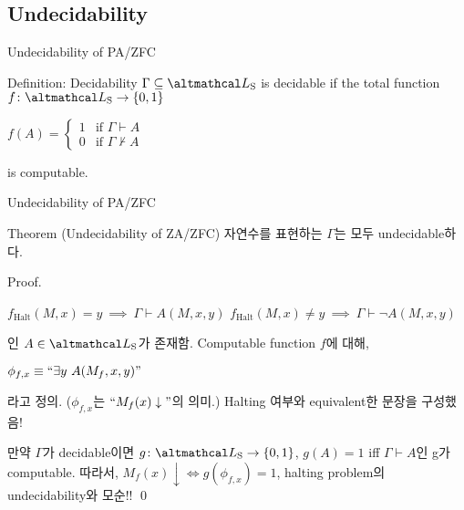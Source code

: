 \documentclass[../231120_msquare_computational-logic.tex]{subfiles}
\begin{document}
\subsection{Undecidability}
\begin{frame}{Undecidability of PA/ZFC}
    \begin{block}{Definition: Decidability}
        \(\Gamma \subseteq \LS\) is decidable if the total function \(f \colon \LS \to \{0,1\}\)
        \centerline{
            \(f(A) = \begin{cases}
                1 & \text{if } \Gamma \vdash A \\
                0 & \text{if }\Gamma \not\vdash A
            \end{cases}\)
        }
        is computable.
    \end{block}
\end{frame}

\begin{frame}{Undecidability of PA/ZFC}
    \begin{block}{Theorem (Undecidability of ZA/ZFC)}
        자연수를 표현하는 \(\Gamma\)는 모두 undecidable하다.
    \end{block}
    \begin{block}{Proof.}
        \begin{itemize}
            \ii \(f_\text{Halt}(M, x) = y \ \implies\ \Gamma \vdash A(M, x, y)\)
            \ii \(f_\text{Halt}(M, x) \neq y \ \implies\ \Gamma \vdash \lnot A(M, x, y)\)
        \end{itemize}
        인 \(A \in \LS\)가 존재함.
        Computable function \(f\)에 대해,
        \centerline{\(\phi_{f,x} \equiv ``\exists y\ A(M_f, x, y)"\)}
        라고 정의. (\(\phi_{f,x}\)는 \(``M_f(x) \downarrow"\)의 의미.)
        {Halting 여부와 equivalent한 문장을 구성했음!}

        만약 \(\Gamma\)가 decidable이면 \(g \colon \LS \to \{0, 1\}\),
        \(g(A) = 1\) iff \(\Gamma \vdash A\)인 g가 computable.
        따라서, \ul{\(M_f(x) \downarrow \iff g(\phi_{f, x}) = 1\)},
        halting problem의 undecidability와 모순!! \qed
    \end{block}
\end{frame}
\end{document}
